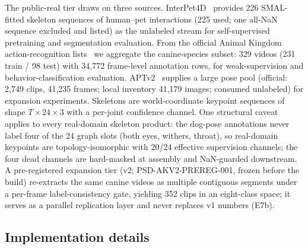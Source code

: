 The public-real tier draws on three sources. InterPet4D~\citep{peng2026interpet4d} provides 226 SMAL-fitted skeleton sequences of human--pet interactions (225 used; one all-NaN sequence excluded and listed) as the unlabeled stream for self-supervised pretraining and segmentation evaluation. From the official Animal Kingdom action-recognition lists~\citep{ng2022animalkingdom} we aggregate the canine-species subset: 329 videos (231 train / 98 test) with 34{,}772 frame-level annotation rows, for weak-supervision and behavior-classification evaluation. APTv2~\citep{yang2023aptv2} supplies a large pose pool (official: 2{,}749 clips, 41{,}235 frames; local inventory 41{,}179 images; consumed unlabeled) for expansion experiments. Skeletons are world-coordinate keypoint sequences of shape $T{\times}24{\times}3$ with a per-joint confidence channel. One structural caveat applies to every real-domain skeleton product: the dog-pose annotations never label four of the 24 graph slots (both eyes, withers, throat), so real-domain keypoints are topology-isomorphic with 20/24 effective supervision channels; the four dead channels are hard-masked at assembly and NaN-guarded downstream. A pre-registered expansion tier (v2; PSD-AKV2-PREREG-001, frozen before the build) re-extracts the same canine videos as multiple contiguous segments under a per-frame label-consistency gate, yielding 352 clips in an eight-class space; it serves as a parallel replication layer and never replaces v1 numbers (E7b).

\subsection{Implementation details}\label{sec:implementation}

